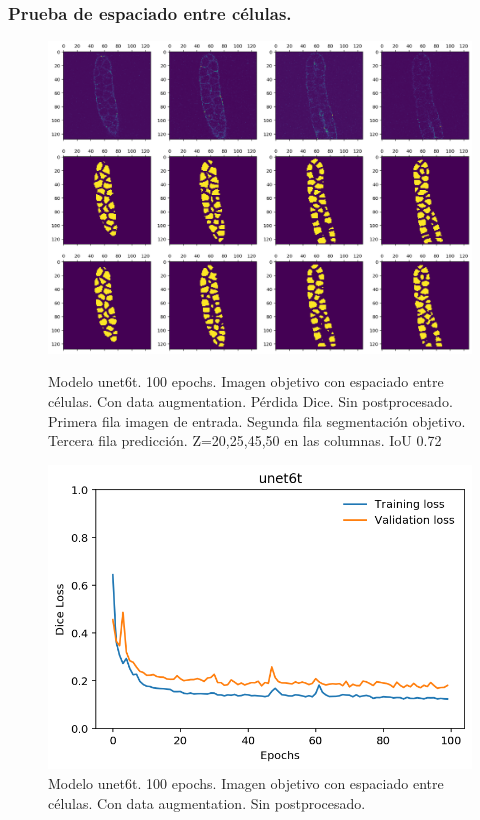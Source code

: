 \clearpage \subsubsection{Prueba de espaciado entre células.}
\begin{figure}[ht]
\centering
\includegraphics[scale=0.35]{img/unet6t-100e-resultados.png} 
\caption{Modelo unet6t. 100 epochs. Imagen objetivo con espaciado entre células. Con data augmentation. Pérdida Dice. Sin postprocesado. Primera fila imagen de entrada. Segunda fila segmentación objetivo. Tercera fila predicción. Z=20,25,45,50 en las columnas. IoU 0.72}\bigskip 
\includegraphics[scale=0.7]{img/unet6t.png} 
\caption{Modelo unet6t. 100 epochs. Imagen objetivo con espaciado entre células. Con data augmentation. Sin postprocesado.}\bigskip 
\end{figure}

